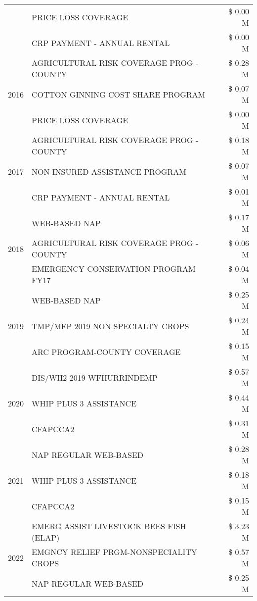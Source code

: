 \begin{tabular}{llr}
 & PRICE LOSS COVERAGE & \$ 0.00 M \\
 & CRP PAYMENT - ANNUAL RENTAL & \$ 0.00 M \\
\cline{1-3}
\multirow[t]{3}{*}{2016} & AGRICULTURAL RISK COVERAGE PROG - COUNTY & \$ 0.28 M \\
 & COTTON GINNING COST SHARE PROGRAM & \$ 0.07 M \\
 & PRICE LOSS COVERAGE & \$ 0.00 M \\
\cline{1-3}
\multirow[t]{3}{*}{2017} & AGRICULTURAL RISK COVERAGE PROG - COUNTY & \$ 0.18 M \\
 & NON-INSURED ASSISTANCE PROGRAM & \$ 0.07 M \\
 & CRP PAYMENT - ANNUAL RENTAL & \$ 0.01 M \\
\cline{1-3}
\multirow[t]{3}{*}{2018} & WEB-BASED NAP & \$ 0.17 M \\
 & AGRICULTURAL RISK COVERAGE PROG - COUNTY & \$ 0.06 M \\
 & EMERGENCY CONSERVATION PROGRAM FY17 & \$ 0.04 M \\
\cline{1-3}
\multirow[t]{3}{*}{2019} & WEB-BASED NAP & \$ 0.25 M \\
 & TMP/MFP 2019 NON SPECIALTY CROPS & \$ 0.24 M \\
 & ARC PROGRAM-COUNTY COVERAGE & \$ 0.15 M \\
\cline{1-3}
\multirow[t]{3}{*}{2020} & DIS/WH2 2019 WFHURRINDEMP & \$ 0.57 M \\
 & WHIP PLUS 3 ASSISTANCE & \$ 0.44 M \\
 & CFAPCCA2 & \$ 0.31 M \\
\cline{1-3}
\multirow[t]{3}{*}{2021} & NAP REGULAR WEB-BASED & \$ 0.28 M \\
 & WHIP PLUS 3 ASSISTANCE & \$ 0.18 M \\
 & CFAPCCA2 & \$ 0.15 M \\
\cline{1-3}
\multirow[t]{3}{*}{2022} & EMERG ASSIST LIVESTOCK BEES FISH (ELAP) & \$ 3.23 M \\
 & EMGNCY RELIEF PRGM-NONSPECIALITY CROPS & \$ 0.57 M \\
 & NAP REGULAR WEB-BASED & \$ 0.25 M \\
\cline{1-3}
\bottomrule
\end{tabular}
